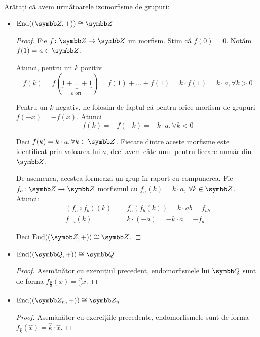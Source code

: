 \begin{exercise}[3.9]
Arătați că avem următoarele izomorfisme de grupuri:
\begin{itemize}
    \item \(\End((\integers, +)) \cong \integers{}\)
    \begin{proof}
    Fie \(\function{f}{\integers}{\integers}\) un morfism. Știm că \(f(0) = 0\). Notăm \(f(1) = a \in \integers\).
    
    Atunci, pentru un \(k\) pozitiv
    \[
        f(k) = f(\underbrace{1 + \dots + 1}_{k \text{ ori }}) = f(1) + \dots + f(1) = k \cdot f(1) = k \cdot a, \forall k > 0
    \]
    
    Pentru un \(k\) negativ, ne folosim de faptul că pentru orice morfism de grupuri \(f(-x) = - f(x)\). Atunci
    \[
        f(k) = - f(- k) = - k \cdot a, \forall k < 0
    \]
    
    Deci \(f(k) = k \cdot a, \forall k \in \integers\). Fiecare dintre aceste morfisme este identificat prin valoarea lui \(a\), deci avem câte unul pentru fiecare număr din \(\integers\).
    
    De asemenea, acestea formează un grup în raport cu compunerea. Fie \(\function{f_a}{\integers}{\integers}\) morfismul cu \(f_a(k) = k \cdot a\), \(\forall k \in \integers\). Atunci:
    \begin{align*}
        (f_a \circ f_b)(k) &= f_a(f_b(k)) = k \cdot ab = f_{ab} \\
        f_{-a}(k) &= k \cdot (-a) = -  k \cdot a = - f_a
    \end{align*}
    
    Deci \(\End((\integers, +)) \cong \integers{}\).
    \end{proof}
    
    \item \(\End((\rationals, +)) \cong \rationals\)
    \begin{proof}
    Asemănător cu exercițiul precedent, endomorfismele lui \(\rationals\) sunt de forma \(f_{\frac{p}{q}} (x) = \frac{p}{q} x\).
    \end{proof}
    
    \item \(\End((\integersmod{n}, +)) \cong \integersmod{n}\)
    \begin{proof}
    Asemănător cu exercițiile precedente, endomorfismele sunt de forma \(f_{\widehat{k}} (\widehat{x}) = \widehat{k} \cdot \widehat{x}\).
    \end{proof}
    

\end{itemize}
\end{exercise}

